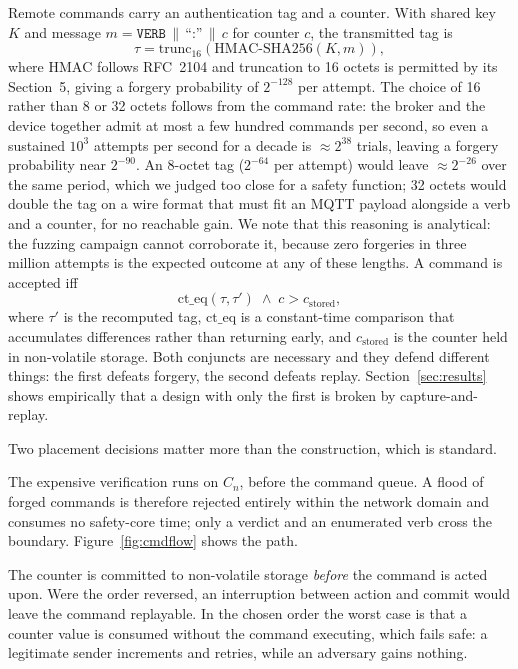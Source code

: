 Remote commands carry an authentication tag and a counter. With shared key $K$ and message
$m = \texttt{VERB}\,\|\,\text{``:''}\,\|\,c$ for counter $c$, the transmitted tag is
\begin{equation}
\tau = \mathrm{trunc}_{16}\!\left(\mathrm{HMAC\text{-}SHA256}(K, m)\right),
\label{eq:tag}
\end{equation}
where $\mathrm{HMAC}$ follows RFC~2104 and truncation to 16 octets is permitted by its
Section~5, giving a forgery probability of $2^{-128}$ per attempt. The choice of 16 rather than 8
or 32 octets follows from the command rate: the broker and the device together admit at most a few
hundred commands per second, so even a sustained $10^{3}$ attempts per second for a decade is
$\approx 2^{38}$ trials, leaving a forgery probability near $2^{-90}$. An 8-octet tag
($2^{-64}$ per attempt) would leave $\approx 2^{-26}$ over the same period, which we judged too
close for a safety function; 32 octets would double the tag on a wire format that must fit an MQTT
payload alongside a verb and a counter, for no reachable gain. We note that this reasoning is
analytical: the fuzzing campaign cannot corroborate it, because zero forgeries in three million
attempts is the expected outcome at any of these lengths. A command is accepted iff
\begin{equation}
\mathrm{ct\_eq}\!\left(\tau, \tau'\right) \;\wedge\; c > c_{\text{stored}},
\label{eq:accept}
\end{equation}
where $\tau'$ is the recomputed tag, $\mathrm{ct\_eq}$ is a constant-time comparison that
accumulates differences rather than returning early, and $c_{\text{stored}}$ is the counter held
in non-volatile storage. Both conjuncts are necessary and they defend different things: the
first defeats forgery, the second defeats replay. Section~\ref{sec:results} shows empirically
that a design with only the first is broken by capture-and-replay.

Two placement decisions matter more than the construction, which is standard.

The expensive verification runs on $C_{n}$, before the command queue. A flood of forged commands
is therefore rejected entirely within the network domain and consumes no safety-core time; only
a verdict and an enumerated verb cross the boundary. Figure~\ref{fig:cmdflow} shows the path.

The counter is committed to non-volatile storage \emph{before} the command is acted upon. Were
the order reversed, an interruption between action and commit would leave the command replayable.
In the chosen order the worst case is that a counter value is consumed without the command
executing, which fails safe: a legitimate sender increments and retries, while an adversary gains
nothing.

